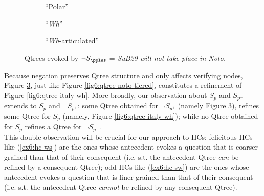 \begin{figure}[H]
	\centering
	\begin{subfigure}[b]{.2\linewidth}
		\centering
		\caption{``Polar''}\label{fig6:qtree-not-noto-polar}
	\end{subfigure}\hfill
	\begin{subfigure}[b]{.37\linewidth}
		\centering
		\caption{``\textit{Wh}''}\label{fig6:qtree-not-noto-wh}
	\end{subfigure}\hfill
	\begin{subfigure}[b]{.37\linewidth}
		\centering
		\caption{``\textit{Wh}-articulated''}\label{fig6:qtree-not-noto-tiered}
	\end{subfigure}
	\caption[]{Qtrees evoked by $\neg S_{\pplus}$ = \textit{SuB29 will not take place in Noto.}}\label{fig6:qtrees-not-noto}
\end{figure}

Because negation preserves Qtree structure and only affects verifying nodes, Figure \ref{fig6:qtree-not-noto-tiered}, just like Figure \ref{fig6:qtree-noto-tiered}, constitutes a refinement of Figure \ref{fig6:qtree-italy-wh}. More broadly, our observation about $S_p$ and $S_{p^+}$ extends to $S_p$ and $\neg S_{p^+}$: some Qtree obtained for $\neg S_{p^+}$ (namely Figure \ref{fig6:qtree-not-noto-tiered}), refines some Qtree for $S_p$ (namely, Figure \ref{fig6:qtree-italy-wh}); while no Qtree obtained for $S_p$ refines a Qtree for $\neg S_{p^+}$.\\

This double observation will be crucial for our approach to HCs: felicitous HCs like (\ref{ex6:hc-ws}) are the ones whose antecedent evokes a question that is coarser-grained than that of their consequent (i.e. s.t. the antecedent Qtree \textit{can} be refined by a consequent Qtree); odd HCs like (\ref{ex6:hc-sw}) are the ones whose antecedent evokes a question that is finer-grained than that of their consequent (i.e. s.t. the antecedent Qtree \textit{cannot} be refined by any consequent Qtree).

